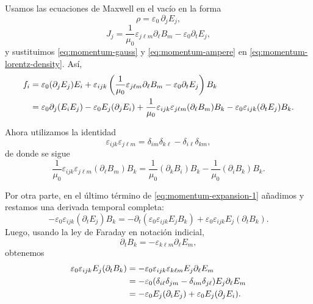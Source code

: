 \documentclass[../main.tex]{subfiles}
\begin{document}
Usamos las ecuaciones de Maxwell en el vacío en la forma
\begin{equation}
    \rho=\varepsilon_0\,\partial_jE_j,
    \label{eq:momentum-gauss}
\end{equation}
\begin{equation}
    J_j=\frac{1}{\mu_0}\varepsilon_{j\ell m}\partial_\ell B_m-\varepsilon_0\partial_tE_j,
    \label{eq:momentum-ampere}
\end{equation}
y sustituimos \eqref{eq:momentum-gauss} y \eqref{eq:momentum-ampere} en \eqref{eq:momentum-lorentz-density}. Así,
\begin{align}
    f_i
    &=\varepsilon_0(\partial_jE_j)E_i
    +\varepsilon_{ijk}
    \left(
        \frac{1}{\mu_0}\varepsilon_{j\ell m}\partial_\ell B_m
        -\varepsilon_0\partial_tE_j
    \right)B_k \notag\\
    &=\varepsilon_0\partial_j(E_iE_j)
    -\varepsilon_0E_j(\partial_jE_i)
    +\frac{1}{\mu_0}\varepsilon_{ijk}\varepsilon_{j\ell m}(\partial_\ell B_m)B_k
    -\varepsilon_0\varepsilon_{ijk}(\partial_tE_j)B_k.
    \label{eq:momentum-expansion-1}
\end{align}

Ahora utilizamos la identidad
\begin{equation}
    \varepsilon_{ijk}\varepsilon_{j\ell m}
    =
    \delta_{im}\delta_{k\ell}
    -
    \delta_{i\ell}\delta_{km},
    \label{eq:momentum-levicivita}
\end{equation}
de donde se sigue
\begin{equation}
    \frac{1}{\mu_0}\varepsilon_{ijk}\varepsilon_{j\ell m}(\partial_\ell B_m)B_k
    =
    \frac{1}{\mu_0}(\partial_kB_i)B_k
    -
    \frac{1}{\mu_0}(\partial_iB_k)B_k.
    \label{eq:momentum-magnetic-part}
\end{equation}

Por otra parte, en el último término de \eqref{eq:momentum-expansion-1} añadimos y restamos una derivada temporal completa:
\begin{equation}
    -\varepsilon_0\varepsilon_{ijk}(\partial_tE_j)B_k
    =
    -\partial_t\!\left(\varepsilon_0\varepsilon_{ijk}E_jB_k\right)
    +
    \varepsilon_0\varepsilon_{ijk}E_j(\partial_tB_k).
    \label{eq:momentum-time-product}
\end{equation}
Luego, usando la ley de Faraday en notación indicial,
\begin{equation}
    \partial_tB_k=-\varepsilon_{k\ell m}\partial_\ell E_m,
    \label{eq:momentum-faraday}
\end{equation}
obtenemos
\begin{align}
    \varepsilon_0\varepsilon_{ijk}E_j(\partial_tB_k)
    &=
    -\varepsilon_0\varepsilon_{ijk}\varepsilon_{k\ell m}E_j\partial_\ell E_m \notag\\
    &=
    -\varepsilon_0
    (\delta_{i\ell}\delta_{jm}-\delta_{im}\delta_{j\ell})
    E_j\partial_\ell E_m \notag\\
    &=
    -\varepsilon_0E_j(\partial_iE_j)
    +
    \varepsilon_0E_j(\partial_jE_i).
    \label{eq:momentum-electric-correction}
\end{align}
\end{document}
